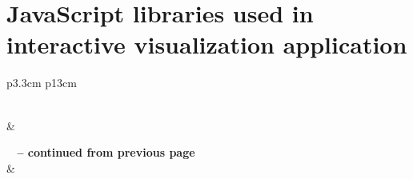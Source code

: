 
\chapter{JavaScript libraries used in interactive visualization application}
\label{appendix:javascript_dependencies}

\begin{center}
\begin{longtable}{p{3.3cm} p{13cm}}
\caption[JavaScript dependencies]{JavaScript libraries} \label{tab:javascript_dependencies} \\

\hline {} &  \\ \hline 
\endfirsthead

%
{{\bfseries \tablename\ \thetable{} -- continued from previous page}} \\
\hline {} &  \\ \hline 
\endhead

\hline {} \\ \hline
\endfoot

\hline \hline
\endlastfoot


\end{longtable}
\end{center}
